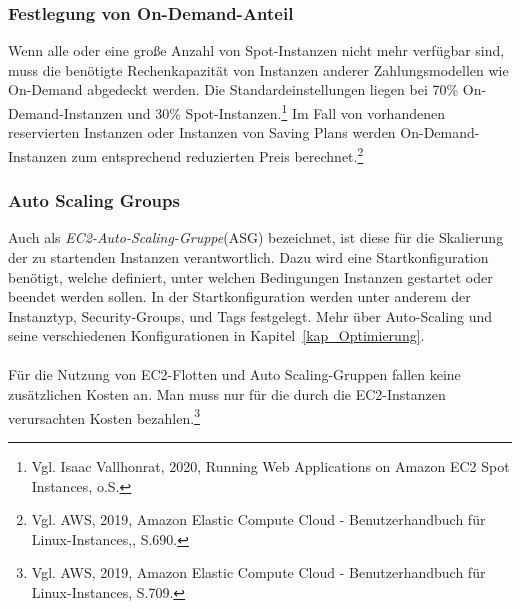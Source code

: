 \subsubsection*{Festlegung von On-Demand-Anteil}
Wenn alle oder eine große Anzahl von Spot-Instanzen nicht mehr verfügbar sind, muss die benötigte Rechenkapazität von Instanzen anderer Zahlungsmodellen wie On-Demand abgedeckt werden. Die Standardeinstellungen liegen bei 70\% On-Demand-Instanzen und 30\% Spot-Instanzen.\footnote{Vgl. Isaac Vallhonrat, 2020, Running Web Applications on Amazon EC2 Spot Instances, o.S.\cite{AMZ24}} Im Fall von vorhandenen reservierten Instanzen oder Instanzen von Saving Plans werden On-Demand-Instanzen zum entsprechend reduzierten Preis berechnet.\footnote{Vgl. AWS, 2019, Amazon Elastic Compute Cloud - Benutzerhandbuch für Linux-Instances,, S.690\cite{AMZ26}.}

\subsubsection*{Auto Scaling Groups}%
Auch als \textit{EC2-Auto-Scaling-Gruppe}(ASG) bezeichnet, ist diese für die Skalierung der zu startenden Instanzen verantwortlich. Dazu wird eine Startkonfiguration benötigt, welche definiert, unter welchen Bedingungen Instanzen gestartet oder beendet werden sollen. In der Startkonfiguration werden unter anderem der Instanztyp, Security-Groups, und Tags festgelegt. Mehr über Auto-Scaling und seine verschiedenen Konfigurationen in Kapitel~\ref{kap_Optimierung}.
\\\\
Für die Nutzung von EC2-Flotten und Auto Scaling-Gruppen fallen keine zusätzlichen Kosten an. Man muss nur für die durch die EC2-Instanzen verursachten Kosten bezahlen.\footnote{Vgl. AWS, 2019, Amazon Elastic Compute Cloud - Benutzerhandbuch für Linux-Instances, S.709\cite{AMZ26}. }

